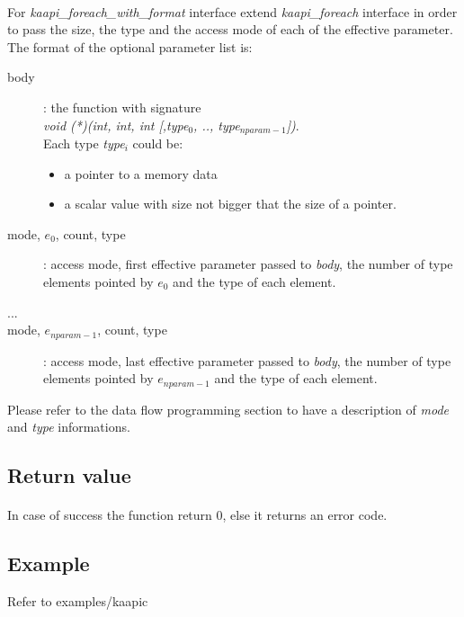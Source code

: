 \documentclass[a4paper, 11pt]{article}
\begin{document}
\paragraph{}
For \textit{kaapi\_foreach\_with\_format} interface extend \textit{kaapi\_foreach} interface in order to pass the size, the type and the access mode of each of the effective parameter. The format of the optional parameter list is:
\begin{description}
\item [body]: the function with signature\\
\hspace*{5ex}\textit{void (*)(int, int, int [,type$_0$, .., type$_{nparam-1}$])}.\\
Each type \textit{type$_i$} could be:
\begin{itemize}
\item a pointer to a memory data
\item a scalar value with size not bigger that the size of a pointer.
\end{itemize}

\item [mode, $e_0$, count, type]: access mode, first effective parameter passed to \textit{body}, the number of type elements pointed by $e_0$ and the type of each element.
\item [...]
\item [mode, $e_{nparam-1}$, count, type]: access mode, last effective parameter passed to \textit{body}, the number of type elements pointed by $e_{nparam-1}$ and the type of each element.
\end{description}
Please refer to the data flow programming section to have a description of \textit{mode} and \textit{type} informations.

\subsection{Return value}
\paragraph{}

In case of success the function return 0, else it returns an error code.

\subsection{Example}
Refer to examples/kaapic\\
\end{document}
